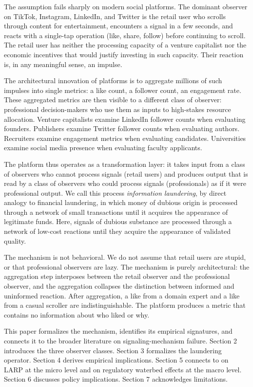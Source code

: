 \documentclass[11pt]{article}
\begin{document}
The assumption fails sharply on modern social platforms. The dominant observer on TikTok, Instagram, LinkedIn, and Twitter is the retail user who scrolls through content for entertainment, encounters a signal in a few seconds, and reacts with a single-tap operation (like, share, follow) before continuing to scroll. The retail user has neither the processing capacity of a venture capitalist nor the economic incentives that would justify investing in such capacity. Their reaction is, in any meaningful sense, an impulse.

The architectural innovation of platforms is to aggregate millions of such impulses into single metrics: a like count, a follower count, an engagement rate. These aggregated metrics are then visible to a different class of observer: professional decision-makers who use them as inputs to high-stakes resource allocation. Venture capitalists examine LinkedIn follower counts when evaluating founders. Publishers examine Twitter follower counts when evaluating authors. Recruiters examine engagement metrics when evaluating candidates. Universities examine social media presence when evaluating faculty applicants.

The platform thus operates as a transformation layer: it takes input from a class of observers who cannot process signals (retail users) and produces output that is read by a class of observers who could process signals (professionals) as if it were professional output. We call this process \emph{information laundering}, by direct analogy to financial laundering, in which money of dubious origin is processed through a network of small transactions until it acquires the appearance of legitimate funds. Here, signals of dubious substance are processed through a network of low-cost reactions until they acquire the appearance of validated quality.

The mechanism is not behavioral. We do not assume that retail users are stupid, or that professional observers are lazy. The mechanism is purely architectural: the aggregation step interposes between the retail observer and the professional observer, and the aggregation collapses the distinction between informed and uninformed reaction. After aggregation, a like from a domain expert and a like from a casual scroller are indistinguishable. The platform produces a metric that contains no information about who liked or why.

This paper formalizes the mechanism, identifies its empirical signatures, and connects it to the broader literature on signaling-mechanism failure. Section 2 introduces the three observer classes. Section 3 formalizes the laundering operator. Section 4 derives empirical implications. Section 5 connects to \cite{vosteen2026larp} on LARP at the micro level and \cite{vosteen2026waterbed} on regulatory waterbed effects at the macro level. Section 6 discusses policy implications. Section 7 acknowledges limitations.
\end{document}
